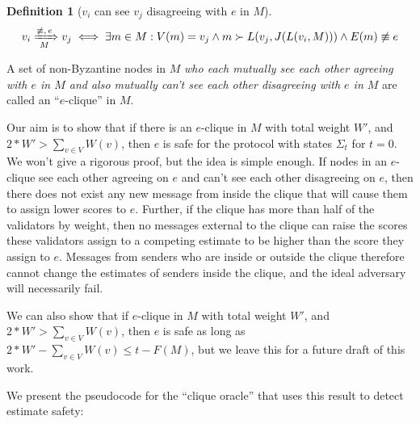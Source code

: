 \documentclass{article}
\theoremstyle{definition}
\newtheorem{defn}{Definition}[section]
\begin{document}
\begin{defn}[$v_i$ can see $v_j$ disagreeing with $e$ in $M$]
$$
v_i \xRightarrow[\text{$M$}]{\text{$\not\equiv, e$}} v_j \iff \exists m \in M : V(m) = v_j \land m \succ L(v_j, J(L(v_i, M))) \land E(m) \not\equiv e
$$
\end{defn}

A set of non-Byzantine nodes in $M$ \emph{who each mutually see each other agreeing with $e$ in $M$ and also mutually can't see each other disagreeing with $e$ in $M$} are called an ``$e$-clique'' in $M$.

Our aim is to show that if there is an $e$-clique in $M$ with total weight $W'$, and $2*W' > \sum_{v\in V} W(v)$, then $e$ is safe for the protocol with states $\Sigma_t$ for $t = 0$. We won't give a rigorous proof, but the idea is simple enough. If nodes in an $e$-clique see each other agreeing on $e$ and can't see each other disagreeing on $e$, then there does not exist any new message from inside the clique that will cause them to assign lower scores to $e$. Further, if the clique has more than half of the validators by weight, then no messages external to the clique can raise the scores these validators assign to a competing estimate to be higher than the score they assign to $e$. Messages from senders who are inside or outside the clique therefore cannot change the estimates of senders inside the clique, and the ideal adversary will necessarily fail.

We can also show that if $e$-clique in $M$ with total weight $W'$, and $2*W' > \sum_{v\in V} W(v)$, then $e$ is safe as long as $2*W' - \sum_{v\in V} W(v) \leq t - F(M)$, but we leave this for a future draft of this work.

We present the pseudocode for the ``clique oracle'' that uses this result to detect estimate safety:
\end{document}
